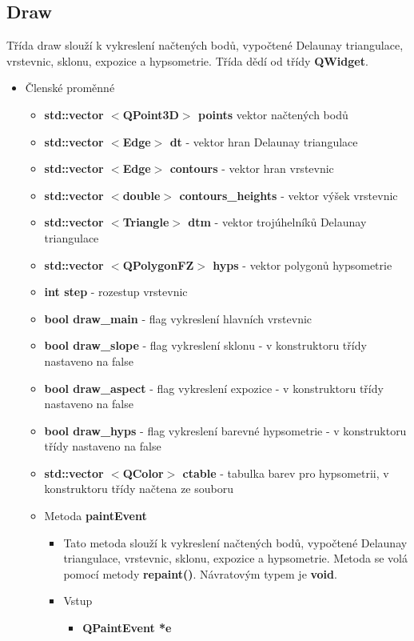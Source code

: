 \documentclass[a4paper, 12pt]{article}
\begin{document}
\subsection{Draw}
Třída draw slouží k vykreslení načtených bodů, vypočtené Delaunay triangulace, vrstevnic, sklonu, expozice a hypsometrie. Třída dědí od třídy \textbf{QWidget}. 

\begin{itemize}
	\item Členské proměnné
		\begin{itemize}
			\item \textbf{std::vector $<$QPoint3D$>$ points } vektor načtených bodů
			\item \textbf{std::vector $<$Edge$>$ dt }- vektor hran Delaunay triangulace
			\item \textbf{std::vector $<$Edge$>$ contours} - vektor hran vrstevnic
			\item \textbf{std::vector $<$double$>$ contours\_heights} - vektor výšek vrstevnic
			\item \textbf{std::vector $<$Triangle$>$ dtm} - vektor trojúhelníků Delaunay triangulace
			\item \textbf{std::vector $<$QPolygonFZ$>$ hyps} - vektor polygonů hypsometrie
			\item \textbf{int step} - rozestup vrstevnic
			\item \textbf{bool draw\_main} - flag vykreslení hlavních vrstevnic
			\item \textbf{bool draw\_slope} - flag vykreslení sklonu - v konstruktoru třídy nastaveno na false
			\item \textbf{bool draw\_aspect} - flag vykreslení expozice - v konstruktoru třídy nastaveno na false
			\item \textbf{bool draw\_hyps} - flag vykreslení barevné hypsometrie - v konstruktoru třídy nastaveno na false
			\item \textbf{std::vector $<$QColor$>$ ctable} - tabulka barev pro hypsometrii, v konstruktoru třídy načtena ze souboru
		\end{itemize}
	
	\begin{itemize}
	\item Metoda \textbf{paintEvent}
		\begin{itemize}
			\item Tato metoda slouží k vykreslení načtených bodů, vypočtené Delaunay triangulace, vrstevnic, sklonu, expozice a hypsometrie. Metoda se volá pomocí metody \textbf{repaint()}. Návratovým typem je \textbf{void}.
			\item Vstup
				\begin{itemize}
					\item \textbf{QPaintEvent *e}
				\end{itemize}
		\end{itemize}


\end{itemize}
\end{itemize}
\end{document}
